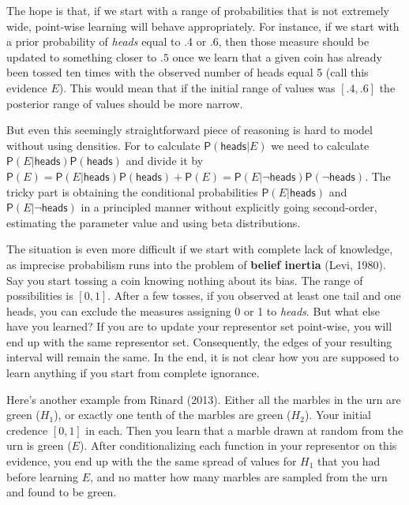 \documentclass[
  10pt,
  dvipsnames,enabledeprecatedfontcommands]{scrartcl}
\newcommand{\pr}[1]{\mathsf{P}(#1)}
\newcommand{\s}[1]{\mbox{$\mathsf{#1}$}}
\begin{document}
\noindent The hope is that, if we start with a range of probabilities
that is not extremely wide, point-wise learning will behave
appropriately. For instance, if we start with a prior probability of
\emph{heads} equal to .4 or .6, then those measure should be updated to
something closer to \(.5\) once we learn that a given coin has already
been tossed ten times with the observed number of heads equal 5 (call
this evidence \(E\)). This would mean that if the initial range of
values was \([.4,.6]\) the posterior range of values should be more
narrow.

But even this seemingly straightforward piece of reasoning is hard to
model without using densities. For to calculate
\(\pr{\s{heads}\vert E}\) we need to calculate
\(\pr{E \vert \s{heads}}\pr{\s{heads}}\) and divide it by
\(\pr{E} = \pr{E \vert \s{heads}}\pr{\s{heads}} + \pr{E} = \pr{E \vert \neg \s{heads}}\pr{\neg \s{heads}}\).
The tricky part is obtaining the conditional probabilities
\(\pr{E \vert \s{heads}}\) and \(\pr{E \vert \neg \s{heads}}\) in a
principled manner without explicitly going second-order, estimating the
parameter value and using beta distributions.

The situation is even more difficult if we start with complete lack of
knowledge, as imprecise probabilism runs into the problem of
\textbf{belief inertia} (Levi, 1980). Say you start tossing a coin
knowing nothing about its bias. The range of possibilities is \([0,1]\).
After a few tosses, if you observed at least one tail and one heads, you
can exclude the measures assigning 0 or 1 to \emph{heads}. But what else
have you learned? If you are to update your representor set point-wise,
you will end up with the same representor set. Consequently, the edges
of your resulting interval will remain the same. In the end, it is not
clear how you are supposed to learn anything if you start from complete
ignorance.

Here's another example from Rinard (2013). Either all the marbles in the
urn are green (\(H_1\)), or exactly one tenth of the marbles are green
(\(H_2\)). Your initial credence \([0,1]\) in each. Then you learn that
a marble drawn at random from the urn is green (\(E\)). After
conditionalizing each function in your representor on this evidence, you
end up with the the same spread of values for \(H_1\) that you had
before learning \(E\), and no matter how many marbles are sampled from
the urn and found to be green.
\end{document}

